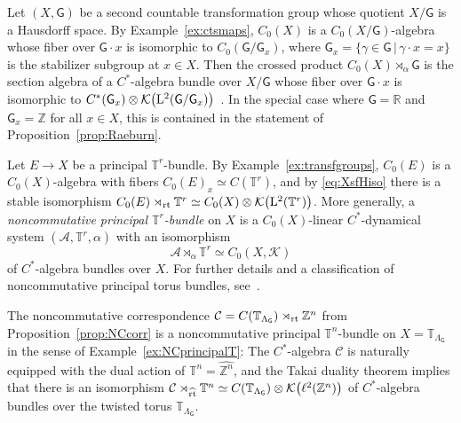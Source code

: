 \documentclass[10pt,a4paper]{amsart}
\numberwithin{equation}{section}
\newcommand{\Z}{\zed}
\newcommand{\CK}{\mathcal{K}}
\newcommand{\Ccal}{\mathcal{C}}
\newcommand{\sfG}{\mathsf{G}}
\newcommand{\Leb}{{\rm L}}
\newcommand{\rt}{{\rm rt}}
\newcommand{\zed}{{\mathbb Z}} %
\newcommand{\real}{{\mathbb R}} %
\newcommand{\torus}{{\mathbb T}} %
\def\alg{{\mathcal A}}
\begin{document}
\begin{Example}
\label{ex:transfgroups}
Let $(X,\sfG)$ be a second countable transformation group whose quotient $X/\sfG$ is a
Hausdorff space. By
Example~\ref{ex:ctsmaps},
$C_0(X)$ is a $C_0(X/\sfG)$-algebra whose fiber over $\sfG\cdot x$ is
isomorphic to
$C_0(\sfG/\sfG_x)$, where $\sfG_x=\{\gamma\in\sfG\,|\,\gamma\cdot x=x\}$ is the stabilizer subgroup at $x\in
X$. Then the crossed product $C_0(X)\rtimes_\alpha\sfG$ is the
section algebra of a $C^*$-algebra bundle over $X/\sfG$ whose fiber
over $\sfG\cdot x$ is isomorphic to
$C^*(\sfG_x)\otimes\CK\big(\Leb^2(\sfG/\sfG_x)\big)$~\cite{Williams1989}. In
the special case where
$\sfG=\real$ and $\sfG_x=\zed$ for all $x\in X$, this is contained in
the statement of Proposition~\ref{prop:Raeburn}.
\end{Example}

\begin{Example}\label{ex:NCprincipalT}
Let $E\to X$ be a principal $\torus^r$-bundle. By
Example~\ref{ex:transfgroups}, $C_0(E)$ is a $C_0(X)$-algebra
with fibers $C_0(E)_x\simeq
C(\torus^r)$, and by \eqref{eq:XsfHiso} there is a
stable isomorphism $C_0(E)\rtimes_\rt\torus^r\simeq
C_0(X)\otimes\CK\big(\Leb^2(\torus^r)\big)$. More generally, a
\emph{noncommutative principal $\torus^r$-bundle} on $X$ is a
$C_0(X)$-linear $C^*$-dynamical system $(\alg,\torus^r,\alpha)$ with
an isomorphism
\[
\alg\rtimes_\alpha\torus^r\simeq C_0(X,\CK)
\]
of $C^*$-algebra bundles over $X$. For further details and a
classification of noncommutative principal torus bundles,
see~\cite{Echterhoff2009,Hannabuss2010}.
\end{Example}

\begin{Example}
The noncommutative correspondence $\Ccal =
C(\torus_{\Lambda_\sfG})\rtimes_\rt\Z^n$ from
Proposition~\ref{prop:NCcorr} is a noncommutative principal
$\torus^n$-bundle on $X=\torus_{\Lambda_\sfG}$ in the sense of
Example~\ref{ex:NCprincipalT}: The $C^*$-algebra $\Ccal$ is naturally equipped with the
dual action of $\torus^n=\widehat{\Z^n}$, and the Takai duality
theorem implies that there is an isomorphism $\Ccal\rtimes_{\widehat{\rt}}\torus^n\simeq
C(\torus_{\Lambda_\sfG})\otimes\CK\big(\ell^2(\Z^n)\big)$ of
$C^*$-algebra bundles over the twisted torus $\torus_{\Lambda_\sfG}$.
\end{Example}
\end{document}
